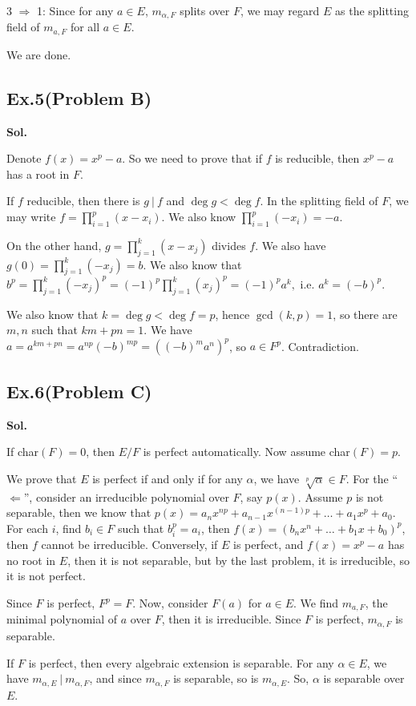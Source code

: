\documentclass[lang=en,11pt,a4paper,citestyle =authoryear]{elegantpaper}
\begin{document}
3 $\Rightarrow$ 1: Since for any $a\in E$, $m_{\alpha, F}$ splits over $F$, we may regard $E$ as the splitting field of $m_{a, F}$ for all $a\in E$.

We are done.
\par 
\vspace{0.5em}

\subsection*{Ex.5(Problem B)}
\textbf{Sol.} \par
   Denote $f(x)=x^p-a$. So we need to prove that if $f$ is reducible, then $x^p-a$ has a root in $F$.

If $f$ reducible, then there is $g\ |\ f$ and $\deg g<\deg f$. In the splitting field of $F$, we may write $f=\prod_{i=1}^p (x-x_i)$. We also know $\prod_{i=1}^p(-x_i)=-a.$ 

On the other hand, $g=\prod_{j=1}^k (x-x_j)$ divides $f$. We also have $g(0)=\prod_{j=1}^k(-x_j)=b$. We also know that $b^p=\prod_{j=1}^k(-x_j)^p=(-1)^p\prod_{j=1}^k(x_j)^p=(-1)^pa^k,$ i.e. $a^k=(-b)^p$. 

We also know that $k=\deg g<\deg f=p$, hence $\gcd(k,p)=1$, so there are $m,n$ such that $km+pn=1$. We have $a=a^{km+pn}=a^{np}(-b)^{mp}=((-b)^ma^n)^p$, so $a\in F^p$. Contradiction.
\par 
\vspace{0.5em}

\subsection*{Ex.6(Problem C)}
\textbf{Sol.} \par
If char$(F)=0$, then $E/F$ is perfect automatically. Now assume char$(F)=p$. 

We prove that $E$ is perfect if and only if for any $\alpha$, we have $\sqrt[p]{\alpha}\in F$. For the ``$\Leftarrow$'', consider an irreducible polynomial over $F$, say $p(x)$. Assume $p$ is not separable, then we know that $p(x)=a_nx^{np}+a_{n-1}x^{(n-1)p}+\dots+a_1x^p+a_0$. For each $i$, find $b_i\in F$ such that $b_i^p=a_i$, then $f(x)=(b_nx^n+\dots+b_1x+b_0)^p$, then $f$ cannot be irreducible. 
Conversely, if $E$ is perfect, and $f(x)=x^p-a$ has no root in $E$, then it is not separable, but by the last problem, it is irreducible, so it is not perfect.

Since $F$ is perfect, $F^p=F$. Now, consider $F(a)$ for $a\in E$. We find $m_{a, F}$, the minimal polynomial of $a$ over $F$, then it is irreducible. Since $F$ is perfect, $m_{\alpha, F}$ is separable. \par
If $F$ is perfect, then every algebraic extension is separable. For any $\alpha\in E$, we have $m_{\alpha, E}\ |\ m_{\alpha, F}$, and since $m_{\alpha, F}$ is separable, so is $m_{\alpha, E}$. So, $\alpha$ is separable over $E$.
\par 
\vspace{0.5em}


\addappheadtotoc
\end{document}
